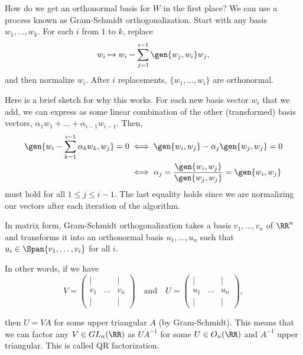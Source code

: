 How do we get an orthonormal basis for $W$ in the first place? We can use a process known as \ac{Gram-Schmidt orthogonalization}. Start with any basis $w_1, \hdots, w_k$. For each $i$ from $1$ to $k$, replace 
\[w_i \mapsto w_i - \sum_{j=1}^{i-1}\gen{w_j, w_i}w_j,\]
and then normalize $w_i$. After $i$ replacements, $\{w_1, \hdots, w_i\}$ are orthonormal. 

Here is a brief sketch for why this works. For each new basis vector $w_i$ that we add, we can express as some linear combination of the other (transformed) basis vectors, $\alpha_1w_1 + \hdots + \alpha_{i-1}w_{i-1}$. Then, 
\begin{align*}
    \gen{w_i - \sum_{k=1}^{i-1}\alpha_k w_k, w_j} = 0 &\iff \gen{w_i, w_j} - \alpha_j\gen{w_j, w_j} = 0 \\
    &\iff \alpha_j = \frac{\gen{w_i, w_j}}{\gen{w_j, w_j}} = \gen{w_i, w_j}
\end{align*}
must hold for all $1\leq j\leq i-1$. The last equality holds since we are normalizing our vectors after each iteration of the algorithm.

In matrix form, Gram-Schmidt orthogonalization takes a basis $v_1, \hdots, v_n$ of $\RR^n$ and transforms it into an orthonormal basis $u_1, \hdots, u_n$ such that $u_i\in \Span \{v_1, \hdots, v_i\}$ for all $i$. 

In other words, if we have 
\[V = \begin{pmatrix}
    \vert & & \vert \\
    v_1   & \hdots & v_n   \\
    \vert & & \vert
\end{pmatrix}\quad \text{and}\quad 
U = \begin{pmatrix}
    \vert & & \vert \\
    u_1   & \hdots & u_n   \\
    \vert & & \vert
\end{pmatrix},\]

then $U = VA$ for some upper triangular $A$ (by Gram-Schmidt). This means that we can factor any $V\in GL_n(\RR)$ as $UA^{-1}$ for some $U\in O_n(\RR)$ and $A^{-1}$ upper triangular. This is called \ac{QR factorization}. 